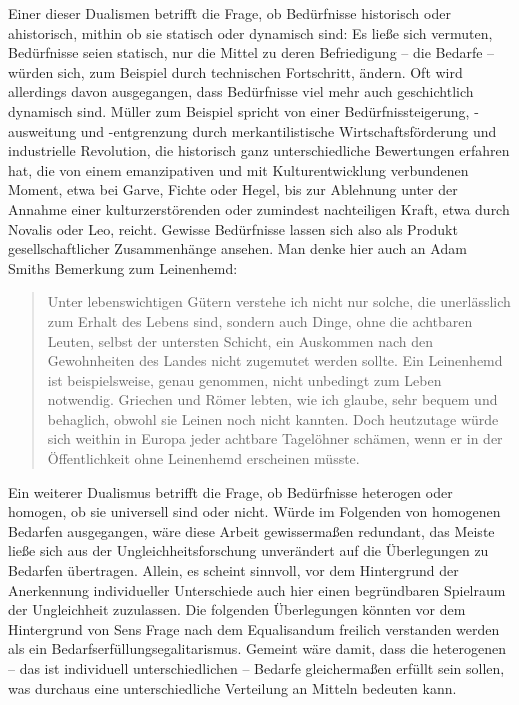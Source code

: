 \documentclass[a4paper]{thesis}
\begin{document}
Einer dieser Dualismen betrifft die Frage, ob Bedürfnisse historisch oder ahistorisch, mithin ob sie statisch oder dynamisch sind: Es ließe sich vermuten, Bedürfnisse seien statisch, nur die Mittel zu deren Befriedigung -- die Bedarfe -- würden sich, zum Beispiel durch technischen Fortschritt, ändern. Oft wird allerdings davon ausgegangen, dass Bedürfnisse viel mehr auch geschichtlich dynamisch sind. Müller zum Beispiel spricht von einer Bedürfnissteigerung, -ausweitung und -entgrenzung durch merkantilistische Wirtschaftsförderung und industrielle Revolution, die historisch ganz unterschiedliche Bewertungen erfahren hat, die von einem emanzipativen und mit Kulturentwicklung verbundenen Moment, etwa bei Garve, Fichte oder Hegel, bis zur Ablehnung unter der Annahme einer kulturzerstörenden oder zumindest nachteiligen Kraft, etwa durch Novalis oder Leo, reicht. Gewisse Bedürfnisse lassen sich also als Produkt gesellschaftlicher Zusammenhänge ansehen. Man denke hier auch an Adam Smiths Bemerkung zum Leinenhemd:

\begin{quote}
Unter lebenswichtigen Gütern verstehe ich nicht nur solche, die unerlässlich zum Erhalt des Lebens sind, sondern auch Dinge, ohne die achtbaren Leuten, selbst der untersten Schicht, ein Auskommen nach den Gewohnheiten des Landes nicht zugemutet werden sollte. Ein Leinenhemd ist beispielsweise, genau genommen, nicht unbedingt zum Leben notwendig. Griechen und Römer lebten, wie ich glaube, sehr bequem und behaglich, obwohl sie Leinen noch nicht kannten. Doch heutzutage würde sich weithin in Europa jeder achtbare Tagelöhner schämen, wenn er in der Öffentlichkeit ohne Leinenhemd erscheinen müsste.
\end{quote}

Ein weiterer Dualismus betrifft die Frage, ob Bedürfnisse heterogen oder homogen, ob sie universell sind oder nicht. Würde im Folgenden von homogenen Bedarfen ausgegangen, wäre diese Arbeit gewissermaßen redundant, das Meiste ließe sich aus der Ungleichheitsforschung unverändert auf die Überlegungen zu Bedarfen übertragen. Allein, es scheint sinnvoll, vor dem Hintergrund der Anerkennung individueller Unterschiede auch hier einen begründbaren Spielraum der Ungleichheit zuzulassen. Die folgenden Überlegungen könnten vor dem Hintergrund von Sens Frage nach dem Equalisandum freilich verstanden werden als ein Bedarfserfüllungsegalitarismus. Gemeint wäre damit, dass die heterogenen -- das ist individuell unterschiedlichen -- Bedarfe gleichermaßen erfüllt sein sollen, was durchaus eine unterschiedliche Verteilung an Mitteln bedeuten kann.
\end{document}
